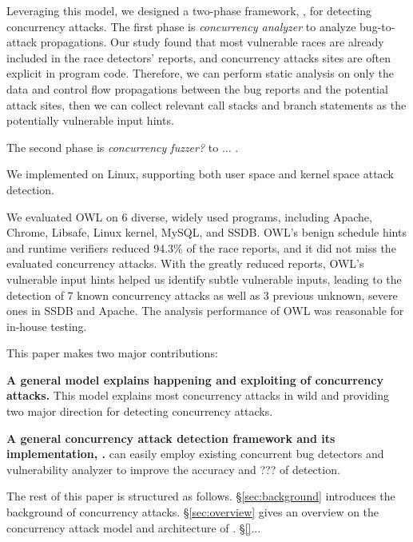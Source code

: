 Leveraging this model, we designed a two-phase framework, \xxx, for detecting concurrency attacks. 
The first phase is \emph{concurrency analyzer} to analyze bug-to-attack propagations. 
Our study found that most vulnerable races are already included in the race detectors’ reports, 
and concurrency attacks sites are often explicit in program code.
Therefore, we can perform static analysis
on only the data and control flow propagations between the
bug reports and the potential attack sites, then we can collect
relevant call stacks and branch statements as the potentially
vulnerable input hints.

The second phase is \emph{concurrency fuzzer?} to ... .

We implemented \xxx on Linux, supporting both user space and kernel space attack detection. 



We evaluated OWL on 6 diverse, widely used programs, including Apache, Chrome, Libsafe, Linux kernel, MySQL,
and SSDB. OWL’s benign schedule hints and runtime verifiers reduced 94.3\% of the race reports, 
and it did not miss the evaluated concurrency attacks. With the greatly reduced reports,
OWL’s vulnerable input hints helped us identify subtle
vulnerable inputs, leading to the detection of 7 known concurrency
attacks as well as 3 previous unknown, severe ones
in SSDB and Apache. The analysis performance of OWL was
reasonable for in-house testing.


This paper makes two major contributions:

\begin{tightenum}
\item \textbf{A general model explains happening and exploiting of concurrency attacks.} 
This model explains most concurrency attacks in wild and 
providing two major direction for detecting concurrency attacks. 
	
\item \textbf{A general concurrency attack detection framework and its implementation, \xxx.} 
\xxx can easily employ existing concurrent bug detectors and vulnerability analyzer 
to improve the accuracy and ??? of detection.
	
\end{tightenum}

 

The rest of this paper is structured as follows. 
\S\ref{sec:background} introduces the background of concurrency attacks.
\S\ref{sec:overview} gives an overview on the concurrency attack model and architecture of \xxx.
\S\ref{}...





